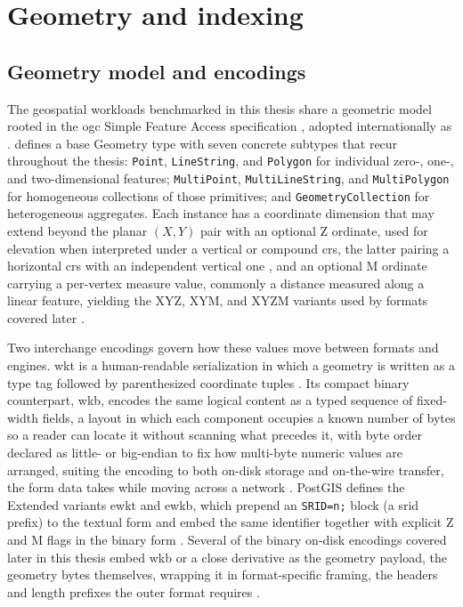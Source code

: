 \section{Geometry and indexing}
\subsection{Geometry model and encodings}
\label{sec:geometry-model-encodings}
The geospatial workloads benchmarked in this thesis share a geometric model rooted in the \acrfull{ogc} Simple Feature Access specification \parencite{herring2011_simple_feature_access_part1}, adopted internationally as \parencite{iso2004_19125_1_simple_feature_access}. \textcite{herring2011_simple_feature_access_part1} defines a base Geometry type with seven concrete subtypes that recur throughout the thesis: \texttt{Point}, \texttt{LineString}, and \texttt{Polygon} for individual zero-, one-, and two-dimensional features; \texttt{MultiPoint}, \texttt{MultiLineString}, and \texttt{MultiPolygon} for homogeneous collections of those primitives; and \texttt{GeometryCollection} for heterogeneous aggregates. Each instance has a coordinate dimension that may extend beyond the planar $(X, Y)$ pair with an optional Z ordinate, used for elevation when interpreted under a vertical or compound \acrfull{crs}, the latter pairing a horizontal \acrshort{crs} with an independent vertical one \parencite{iso2019_19111_referencing_by_coordinates}, and an optional M ordinate carrying a per-vertex measure value, commonly a distance measured along a linear feature, yielding the XYZ, XYM, and XYZM variants used by formats covered later \parencite{herring2011_simple_feature_access_part1}.

Two interchange encodings govern how these values move between formats and engines. \acrfull{wkt} is a human-readable serialization in which a geometry is written as a type tag followed by parenthesized coordinate tuples \parencite{herring2011_simple_feature_access_part1}. Its compact binary counterpart, \acrfull{wkb}, encodes the same logical content as a typed sequence of fixed-width fields, a layout in which each component occupies a known number of bytes so a reader can locate it without scanning what precedes it, with byte order declared as little- or big-endian to fix how multi-byte numeric values are arranged, suiting the encoding to both on-disk storage and on-the-wire transfer, the form data takes while moving across a network \parencite{herring2011_simple_feature_access_part1}. PostGIS defines the Extended variants \acrfull{ewkt} and \acrfull{ewkb}, which prepend an \texttt{SRID=n;} block (a \acrfull{srid} prefix) to the textual form and embed the same identifier together with explicit Z and M flags in the binary form \parencite{postgis2024_manual_34, geos2021_wkb_specification}. Several of the binary on-disk encodings covered later in this thesis embed \acrshort{wkb} or a close derivative as the geometry payload, the geometry bytes themselves, wrapping it in format-specific framing, the headers and length prefixes the outer format requires \parencite{postgis2024_manual_34, ogc2024_geopackage_encoding_standard_140, ogc2024_geoparquet_specification_v110}.

